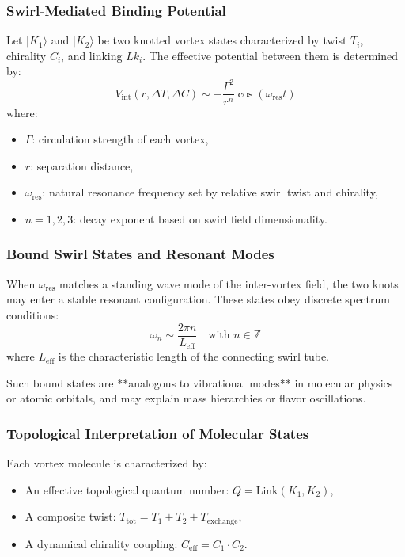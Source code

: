 \subsubsection*{Swirl-Mediated Binding Potential}

Let $|K_1\rangle$ and $|K_2\rangle$ be two knotted vortex states characterized by twist $T_i$, chirality $C_i$, and linking $Lk_i$. The effective potential between them is determined by:
\begin{equation}
V_{\text{int}}(r, \Delta T, \Delta C) \sim -\frac{\Gamma^2}{r^n} \cos(\omega_{\text{res}} t)
\end{equation}
where:
\begin{itemize}
    \item $\Gamma$: circulation strength of each vortex,
    \item $r$: separation distance,
    \item $\omega_{\text{res}}$: natural resonance frequency set by relative swirl twist and chirality,
    \item $n = 1, 2, 3$: decay exponent based on swirl field dimensionality.
\end{itemize}

\subsubsection*{Bound Swirl States and Resonant Modes}

When $\omega_{\text{res}}$ matches a standing wave mode of the inter-vortex field, the two knots may enter a stable resonant configuration. These states obey discrete spectrum conditions:
\[
\omega_n \sim \frac{2\pi n}{L_{\text{eff}}}
\quad \text{with } n \in \mathbb{Z}
\]
where $L_{\text{eff}}$ is the characteristic length of the connecting swirl tube.

Such bound states are **analogous to vibrational modes** in molecular physics or atomic orbitals, and may explain mass hierarchies or flavor oscillations.

\subsubsection*{Topological Interpretation of Molecular States}

Each vortex molecule is characterized by:
\begin{itemize}
    \item An effective topological quantum number: $Q = \text{Link}(K_1, K_2)$,
    \item A composite twist: $T_{\text{tot}} = T_1 + T_2 + T_{\text{exchange}}$,
    \item A dynamical chirality coupling: $C_{\text{eff}} = C_1 \cdot C_2$.
\end{itemize}


